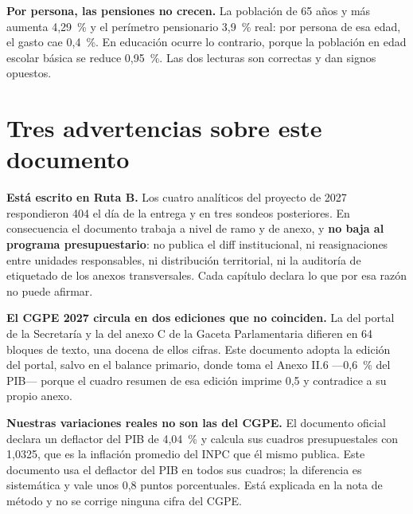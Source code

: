 \textbf{Por persona, las pensiones no crecen.} La población de 65 años y más aumenta 4,29~\%
y el perímetro pensionario 3,9~\% real: por persona de esa edad, el gasto cae 0,4~\%. En
educación ocurre lo contrario, porque la población en edad escolar básica se reduce 0,95~\%.
Las dos lecturas son correctas y dan signos opuestos.

\section*{Tres advertencias sobre este documento}

\textbf{Está escrito en Ruta B.} Los cuatro analíticos del proyecto de 2027 respondieron 404
el día de la entrega y en tres sondeos posteriores. En consecuencia el documento trabaja a
nivel de ramo y de anexo, y \textbf{no baja al programa presupuestario}: no publica el diff
institucional, ni reasignaciones entre unidades responsables, ni distribución territorial, ni
la auditoría de etiquetado de los anexos transversales. Cada capítulo declara lo que por esa
razón no puede afirmar.

\textbf{El CGPE 2027 circula en dos ediciones que no coinciden.} La del portal de la
Secretaría y la del anexo C de la Gaceta Parlamentaria difieren en 64 bloques de texto, una
docena de ellos cifras. Este documento adopta la edición del portal, salvo en el balance
primario, donde toma el Anexo II.6 ---0,6~\% del PIB--- porque el cuadro resumen de esa
edición imprime 0,5 y contradice a su propio anexo.

\textbf{Nuestras variaciones reales no son las del CGPE.} El documento oficial declara un
deflactor del PIB de 4,04~\% y calcula sus cuadros presupuestales con 1,0325, que es la
inflación promedio del INPC que él mismo publica. Este documento usa el deflactor del PIB en
todos sus cuadros; la diferencia es sistemática y vale unos 0,8 puntos porcentuales. Está
explicada en la nota de método y no se corrige ninguna cifra del CGPE.
